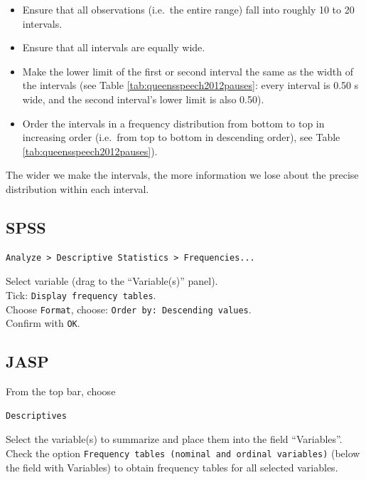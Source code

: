 \documentclass[
]{book}
\begin{document}
\begin{itemize}
\item
  Ensure that all observations (i.e.~the entire range) fall into
  roughly 10 to 20 intervals.
\item
  Ensure that all intervals are equally wide.
\item
  Make the lower limit of the first or second interval the same as
  the width of the intervals (see
  Table \ref{tab:queensspeech2012pauses}: every interval is 0.50 s
  wide, and the second interval's lower limit is also 0.50).
\item
  Order the intervals in a frequency distribution from bottom
  to top in increasing order (i.e.~from top to bottom in
  descending order), see
  Table \ref{tab:queensspeech2012pauses}).
\end{itemize}

The wider we make the intervals, the more information we lose
about the precise distribution within each interval.

\subsection{SPSS}\label{spss-1}

\begin{verbatim}
Analyze > Descriptive Statistics > Frequencies...
\end{verbatim}

Select variable (drag to the ``Variable(s)'' panel).\\
Tick: \texttt{Display\ frequency\ tables}.\\
Choose \texttt{Format}, choose: \texttt{Order\ by:\ Descending\ values}.\\
Confirm with \texttt{OK}.\\

\subsection{JASP}\label{jasp-1}

From the top bar, choose

\begin{verbatim}
Descriptives
\end{verbatim}

Select the variable(s) to summarize and place them into the field ``Variables''. Check the option \texttt{Frequency\ tables\ (nominal\ and\ ordinal\ variables)} (below the field with Variables) to obtain frequency tables for all selected variables.
\end{document}
